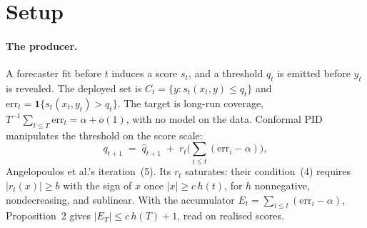 \section{Setup}
\label{sec:setup}

\paragraph{The producer.} A forecaster fit before $t$ induces a score $s_t$, and a threshold
$q_t$ is emitted before $y_t$ is revealed. The deployed set is $C_t = \{y : s_t(x_t,y)
\le q_t\}$ and $\mathrm{err}_t = \mathbf{1}\{s_t(x_t,y_t) > q_t\}$. The target is long-run
coverage, $T^{-1}\sum_{t \le T}\mathrm{err}_t = \alpha + o(1)$, with no model on the data.
Conformal PID \citep{angelopoulos2023pid} manipulates the threshold on the score scale:
\begin{equation}
  q_{t+1} \;=\; \hat{q}_{t+1} \;+\; r_t\Big(\textstyle\sum_{i \le t}(\mathrm{err}_i - \alpha)\Big),
  \label{eq:pid}
\end{equation}
Angelopoulos et al.'s iteration~(5). Its $r_t$ saturates: their condition~(4) requires $|r_t(x)| \ge b$ with the sign of
$x$ once $|x| \ge c\,h(t)$, for $h$ nonnegative, nondecreasing, and sublinear. With the accumulator
$E_t = \sum_{i \le t}(\mathrm{err}_i-\alpha)$, Proposition~2 gives $|E_T| \le c\,h(T)+1$, read on realised scores.

